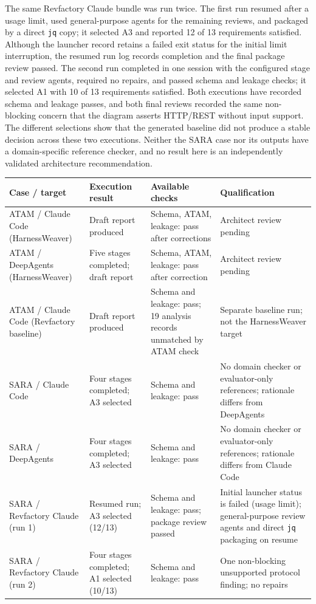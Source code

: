 \documentclass[10pt,conference]{IEEEtran}
\begin{document}
The same Revfactory Claude bundle was run twice. The first run resumed after a usage limit, used general-purpose agents for the remaining reviews, and packaged by a direct \texttt{jq} copy; it selected A3 and reported 12 of 13 requirements satisfied. Although the launcher record retains a failed exit status for the initial limit interruption, the resumed run log records completion and the final package review passed. The second run completed in one session with the configured stage and review agents, required no repairs, and passed schema and leakage checks; it selected A1 with 10 of 13 requirements satisfied. Both executions have recorded schema and leakage passes, and both final reviews recorded the same non-blocking concern that the diagram asserts HTTP/REST without input support. The different selections show that the generated baseline did not produce a stable decision across these two executions. Neither the SARA case nor its outputs have a domain-specific reference checker, and no result here is an independently validated architecture recommendation.

\begin{table}[t]
\centering\footnotesize\renewcommand{\arraystretch}{1.12}
\begin{tabularx}{\textwidth}{>{\raggedright\arraybackslash}p{} >{\raggedright\arraybackslash}p{} >{\raggedright\arraybackslash}X >{\raggedright\arraybackslash}X}
\toprule
Case / target & Execution result & Available checks & Qualification\tabularnewline
\midrule
ATAM / Claude Code (HarnessWeaver) & Draft report produced & Schema, ATAM, leakage: pass after corrections & Architect review pending\tabularnewline
ATAM / DeepAgents (HarnessWeaver) & Five stages completed; draft report & Schema, ATAM, leakage: pass after correction & Architect review pending\tabularnewline
ATAM / Claude Code (Revfactory baseline) & Draft report produced & Schema and leakage: pass; 19 analysis records unmatched by ATAM check & Separate baseline run; not the HarnessWeaver target\tabularnewline
SARA / Claude Code & Four stages completed; A3 selected & Schema and leakage: pass & No domain checker or evaluator-only references; rationale differs from DeepAgents\tabularnewline
SARA / DeepAgents & Four stages completed; A3 selected & Schema and leakage: pass & No domain checker or evaluator-only references; rationale differs from Claude Code\tabularnewline
SARA / Revfactory Claude (run 1) & Resumed run; A3 selected (12/13) & Schema and leakage: pass; package review passed & Initial launcher status is failed (usage limit); general-purpose review agents and direct \texttt{jq} packaging on resume\tabularnewline
SARA / Revfactory Claude (run 2) & Four stages completed; A1 selected (10/13) & Schema and leakage: pass & One non-blocking unsupported protocol finding; no repairs\tabularnewline
\bottomrule
\end{tabularx}
\end{table}
\end{document}
